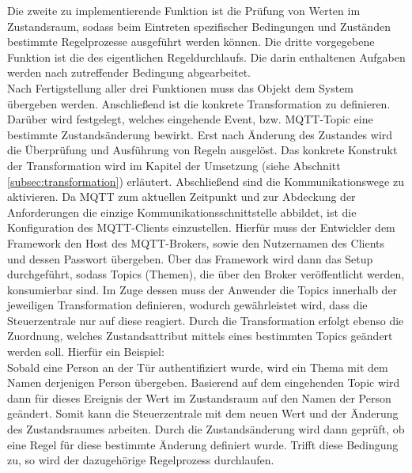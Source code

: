         Die zweite zu implementierende Funktion ist die Prüfung von Werten im Zustandsraum, sodass beim Eintreten spezifischer 
        Bedingungen und Zuständen bestimmte Regelprozesse ausgeführt werden können. Die dritte vorgegebene Funktion ist die 
        des eigentlichen Regeldurchlaufs. Die darin enthaltenen Aufgaben werden nach zutreffender Bedingung abgearbeitet.
        \\
        Nach Fertigstellung aller drei Funktionen muss das Objekt dem System übergeben werden. Anschließend ist die 
        konkrete Transformation zu definieren. Darüber wird festgelegt, welches eingehende Event, bzw. \acs{MQTT}-Topic 
        eine bestimmte Zustandsänderung bewirkt. Erst nach Änderung des Zustandes wird die Überprüfung und Ausführung 
        von Regeln ausgelöst. Das konkrete Konstrukt der Transformation wird im Kapitel der Umsetzung (siehe Abschnitt \ref{subsec:transformation}) 
        erläutert. Abschließend sind die Kommunikationswege zu aktivieren. 
        Da \acs{MQTT} zum aktuellen Zeitpunkt und zur Abdeckung der Anforderungen die einzige Kommunikationsschnittstelle 
        abbildet, ist die Konfiguration des \acs{MQTT}-Clients einzustellen. Hierfür muss der Entwickler 
        dem Framework den Host des \acs{MQTT}-Brokers, sowie den Nutzernamen des Clients und dessen Passwort übergeben. Über das 
        Framework wird dann das Setup durchgeführt, sodass Topics (Themen), die über den Broker veröffentlicht werden, konsumierbar 
        sind. Im Zuge dessen muss der Anwender die Topics innerhalb der jeweiligen Transformation definieren, wodurch gewährleistet wird, dass 
        die Steuerzentrale nur auf diese reagiert. Durch die Transformation erfolgt ebenso die 
        Zuordnung, welches Zustandsattribut mittels eines bestimmten Topics geändert werden soll. Hierfür ein Beispiel:  
        \\
        \linebreak
        Sobald eine Person an der Tür authentifiziert wurde, wird ein Thema mit dem Namen derjenigen Person übergeben. Basierend auf 
        dem eingehenden Topic wird dann für dieses Ereignis der Wert im Zustandsraum auf den Namen der Person geändert. Somit kann 
        die Steuerzentrale mit dem neuen Wert und der Änderung des Zustandsraumes arbeiten. Durch die Zustandsänderung wird dann 
        geprüft, ob eine Regel für diese bestimmte Änderung definiert wurde. Trifft diese Bedingung zu, so wird der dazugehörige Regelprozess 
        durchlaufen.  
        \\
        \linebreak
